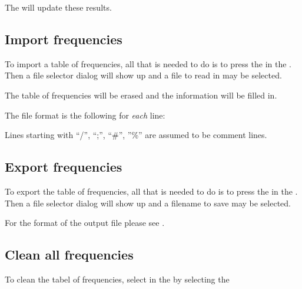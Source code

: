 The  will update these results.

\subsection{Import frequencies}%
\label{period.import}
To import a table of frequencies, all that is needed to do is
to press the  in the %
. Then a file selector dialog will show up and a file to 
read in may be selected.

The table of frequencies will be erased and the information will be filled
in.

The file format is the following for {\it each} line:

Lines starting with ``/'', ``;'', ``\#'', ''\%''
are assumed to be comment lines.

\subsection{Export frequencies}%
\label{period.export}
To export the table of frequencies, all that is needed to do is
to press the  in the .
Then a file selector dialog will show up and a filename to save
may be selected.

For the format of the output file please see
.

\subsection{Clean all frequencies}%
\label{period.cleanfrequencies}
To clean the tabel of frequencies, select in the  by selecting the 

